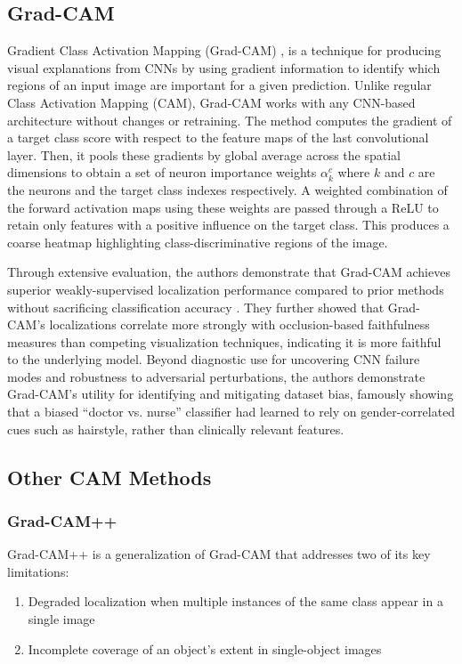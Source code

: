 \subsection{Grad-CAM}

Gradient Class Activation Mapping (Grad-CAM) \cite{selvaraju2017grad}, is a technique for producing
visual explanations from CNNs by using gradient information to identify which regions of an input image are important for a given
prediction. Unlike regular Class Activation Mapping (CAM), Grad-CAM works with any CNN-based architecture without changes
or retraining. The method computes the gradient of a target class score with respect to the feature maps of the
last convolutional layer. Then, it pools these gradients by global average across the spatial dimensions to obtain a set of neuron
importance weights $\alpha_k^c$ where $k$ and $c$  are the neurons and the target class  indexes respectively.
A weighted combination of the forward activation maps using these weights are passed through a
ReLU to retain only features with a positive influence on the target class. This produces a coarse heatmap highlighting
class-discriminative regions of the image.

Through extensive evaluation, the authors demonstrate that Grad-CAM achieves superior weakly-supervised localization performance
compared to prior methods without sacrificing classification accuracy \cite{selvaraju2017grad}. They further showed that
Grad-CAM's localizations correlate more strongly
with occlusion-based faithfulness measures than competing visualization techniques, indicating it is more faithful to the
underlying model. Beyond diagnostic use for uncovering CNN failure modes and robustness to adversarial perturbations, the authors
demonstrate Grad-CAM's utility for identifying and mitigating dataset bias, famously showing that a biased ``doctor vs. nurse''
classifier had learned to rely on gender-correlated cues such as hairstyle, rather than clinically relevant features.

\subsection{Other CAM Methods}

\subsubsection{Grad-CAM++}

Grad-CAM++ \cite{chattopadhay2018grad} is a generalization of Grad-CAM that addresses two of its key limitations:
\begin{enumerate}
    \item Degraded localization when multiple instances of the same class appear in a single image
    \item Incomplete coverage of an object's extent in single-object images
\end{enumerate}

